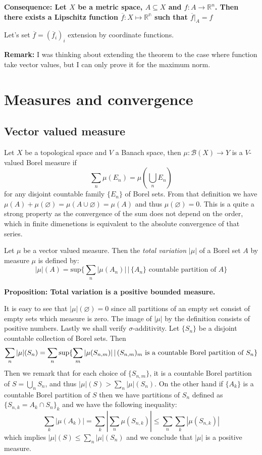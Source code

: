 \documentclass{article}
\begin{document}
\vspace{1ex}
\textbf{Consequence: Let $X$ be a metric space, $A\subseteq X$ and
$f:A\rightarrow\mathbb{R}^n$. Then there exists a Lipschitz
function $\overline f:X\mapsto\mathbb{R^n}$ such that $\overline f|_A=f$}

\vspace{1ex}
Let's set $\overline f = (\overline f_i)_i$ extension by coordinate functions. 

\vspace{1ex}
\textbf{Remark:} I was thinking about extending the theorem to the case where
function take vector values, but I can only prove it for the maximum norm.

\section{Measures and convergence}

\subsection{Vector valued measure}
Let $X$ be a topological space and $V$ a Banach space, then $\mu:\mathcal{B}(X)
\rightarrow Y$ is a $V$-valued Borel measure if
\[\sum_n\mu(E_n)=\mu(\bigcup_n E_n)\]
for any disjoint countable family $\{E_n\}$ of Borel sets. From that definition
we have $\mu(A)+\mu(\varnothing)=\mu(A\cup\varnothing)=\mu(A)$ and thus 
$\mu(\varnothing)=0$. This is a quite a strong property as the convergence of
the sum does not depend on the order, which in finite dimenetions is equivalent
to the absolute convergence of that series.

\vspace{1ex} Let $\mu$ be a vector valued measure. Then the \emph{total
variation} $|\mu|$ of a Borel set $A$  by measure $\mu$ is defined by:
\[|\mu|(A) = \text{sup}\{\sum_n|\mu(A_n)|\,|\,\{A_n\}\text{ countable partition of }A\}\]

\textbf{Proposition: Total variation is a positive bounded measure.}

\vspace{1ex}
It is easy to see that $|\mu|(\varnothing)=0$ since all partitions of an empty
set consist of empty sets which measure is zero. The image of $|\mu|$ by the
definition consists of positive numbers. Lastly we shall verify $\sigma$-additivity.
Let $\{S_n\}$ be a disjoint countable collection of Borel sets. Then
\[ 
    \sum_n|\mu|(S_n) = \sum_n\sup\{\sum_m|\mu(S_{n,m})|\,|\,(S_{n,m})_m\text{ is a countable Borel partition of }S_n\} \\ 
\]
Then we remark that for each choice of $\{S_{n,m}\}$, it is a countable Borel
partition of $S=\bigcup_n S_n$, and thus $|\mu|(S)>\sum_n|\mu|(S_n)$. On the
other hand if $\{A_k\}$ is a countable Borel partition of $S$ then we have
partitions of $S_n$ defined as $\{S_{n,k}=A_k\cap S_n\}_k$ and we have the
following inequality:
\[
    \sum_k|\mu(A_k)|=\sum_k|\sum_n\mu(S_{n,k})|\leq\sum_n\sum_k|\mu(S_{n,k})|
\]
which implies $|\mu|(S)\leq\sum_n|\mu|(S_n)$ and we conclude that $|\mu|$ is a
positive measure.
\end{document}

